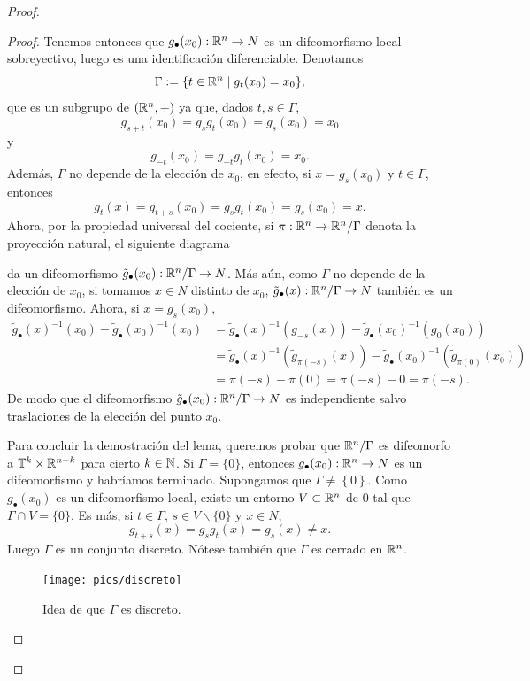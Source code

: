\begin{proof}
\begin{proof}
Tenemos entonces que $g_\bullet (x_0):\mathbb{R}^n\rightarrow N$ es un difeomorfismo local sobreyectivo, luego es una identificación diferenciable. Denotamos 
\[  
  \Gamma:=\{t \in \mathbb{R}^n \mid g_t(x_0)=x_0\},
\]
que es un subgrupo de $(\mathbb{R}^n,+)$ ya que, dados $t, s \in \Gamma$, 
\[
  g_{s+t}(x_0)=g_sg_t(x_0)=g_s(x_0)=x_0
\]
y 
\[
  g_{-t}(x_0)=g_{-t}g_t(x_0)=x_0.
\] 
 Además, $\Gamma$ no depende de la elección de $x_0$, en efecto, si $x=g_s (x_0)$ y $t\in \Gamma$, entonces 
\[
  g_t (x) = g_{t+s}(x_0)=g_sg_t(x_0)=g_s(x_0)=x. 
 \] 
Ahora, por la propiedad universal del cociente, si $\pi:\mathbb{R}^n\rightarrow \mathbb{R}^n/\Gamma$ denota la proyección natural, el siguiente diagrama
\begin{center}
\end{center}
da un difeomorfismo $\tilde{g}_\bullet (x_0): \mathbb{R}^n/\Gamma \rightarrow N$. Más aún, como $\Gamma$ no depende de la elección de $x_0$, si tomamos $x\in N$ distinto de $x_0$, $\tilde{g}_\bullet(x):\mathbb{R}^n/\Gamma\rightarrow N$ también es un difeomorfismo. Ahora, si $x=g_s(x_0)$, 
\begin{align*}
  \tilde{g}_\bullet(x)^{-1}(x_0)-\tilde{g}_\bullet(x_0)^{-1}(x_0)&=\tilde{g}_\bullet(x)^{-1}(g_{-s}(x))-\tilde{g}_\bullet(x_0)^{-1}(g_0(x_0)) \\ &=\tilde{g}_\bullet(x)^{-1}(\tilde{g}_{\pi(-s)}(x))-\tilde{g}_\bullet(x_0)^{-1}(\tilde{g}_{\pi(0)}(x_0))\\ &=\pi(-s)-\pi(0)=\pi(-s)-0=\pi(-s).
\end{align*}
De modo que el difeomorfismo $\tilde{g}_\bullet (x_0): \mathbb{R}^n/\Gamma \rightarrow N$ es independiente salvo traslaciones de la elección del punto $x_0$.

Para concluir la demostración del lema, queremos probar que $\mathbb{R}^n/\Gamma$ es difeomorfo a $\mathbb{T}^k\times \mathbb{R}^{n-k}$ para cierto $k\in \mathbb{N}$. Si $\Gamma=\{0\}$, entonces $g_\bullet (x_0):\mathbb{R}^n\rightarrow N$ es un difeomorfismo y habríamos terminado. Supongamos que $\Gamma \neq\left\{ 0 \right\}$.
 Como $g_\bullet(x_0)$ es un difeomorfismo local, existe un entorno $V\subset \mathbb{R}^n$ de 0 tal que $\Gamma\cap V= \{0\}$. Es más, si $t\in \Gamma$, $s\in V\backslash \{0\}$ y $x\in N$, 
  \[
    g_{t+s}(x)=g_sg_t(x)=g_s(x)\neq x.
  \]
  Luego $\Gamma$ es un conjunto discreto. Nótese también que $\Gamma$ es cerrado en $\mathbb{R}^n$.
  \begin{figure}[h!]
    \centering
    \texttt{[image: pics/discreto]}
    \caption{\small Idea de que $\Gamma$ es discreto.}
    \label{fig:discreto}
  \end{figure}


\end{proof}
\end{proof}
